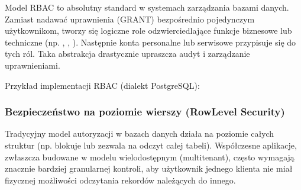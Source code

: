 \documentclass[letterpaper,10pt,polish]{sphinxmanual}
\begin{document}
\sphinxAtStartPar
{}

\sphinxAtStartPar
Model RBAC to absolutny standard w systemach zarządzania bazami danych. Zamiast nadawać uprawnienia (GRANT) bezpośrednio pojedynczym użytkownikom, tworzy się logiczne role odzwierciedlające funkcje biznesowe lub techniczne (np. , , ). Następnie konta personalne lub serwisowe przypisuje się do tych ról. Taka abstrakcja drastycznie upraszcza audyt i zarządzanie uprawnieniami.

\sphinxAtStartPar
Przykład implementacji RBAC (dialekt PostgreSQL):

\begin{sphinxVerbatim}[commandchars=\\\{\}]

\end{sphinxVerbatim}


\subsubsection{Bezpieczeństwo na poziomie wierszy (Row\sphinxhyphen{}Level Security)}
\label{\detokenize{rozdzia_u0142_2/rozdzia_u0142_27/rozdzial_3:bezpieczenstwo-na-poziomie-wierszy-row-level-security}}
\sphinxAtStartPar
Tradycyjny model autoryzacji w bazach danych działa na poziomie całych struktur (np. blokuje lub zezwala na odczyt całej tabeli). Współczesne aplikacje, zwłaszcza budowane w modelu wielodostępnym (multi\sphinxhyphen{}tenant), często wymagają znacznie bardziej granularnej kontroli, aby użytkownik jednego klienta nie miał fizycznej możliwości odczytania rekordów należących do innego.
\end{document}
